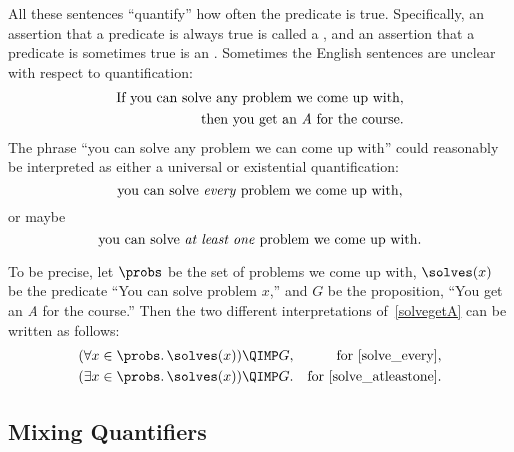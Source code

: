 All these sentences ``quantify'' how often the predicate is true.
Specifically, an assertion that a predicate is always true is called a
, and an assertion that a predicate is
sometimes true is an .  Sometimes the
English sentences are unclear with respect to quantification:
\begin{align}
  \text{If you can solve any problem we come up with,}\notag\\
  \text{then you get an \emph{A} for the course.}\label{solvegetA}
\end{align}
%
The phrase ``you can solve any problem we can come up with'' could
reasonably be interpreted as either a universal or existential
quantification:
\begin{equation}\label{solve_every}
\text{you can solve \emph{every} problem we come up with,}
\end{equation}
or maybe
\begin{equation}\label{solve_atleastone}
\text{you can solve \emph{at least one} problem we come up with.}
\end{equation}

\iffalse
In any case, notice that this quantified phrase appears inside a
larger if-then statement.  This is quite normal; quantified statements
are themselves propositions and can be combined
with \QAND, \QOR, \QIMPLIES, etc., just like any other proposition.
\fi
To be precise, let $\probs$ be the set of problems we come up with,
$\solves(x)$ be the predicate ``You can solve problem $x$,'' and $G$
be the proposition, ``You get an \emph{A} for the course.''  Then the
two different interpretations of~\eqref{solvegetA}
can be written as follows:
\begin{align*}
(\forall x \in \probs.\, & \solves(x)) \QIMP G,
     & \text{for~\eqref{solve_every}},\\
(\exists x \in \probs.\, & \solves(x)) \QIMP G.
     & \text{for~\eqref{solve_atleastone}}.
\end{align*}

\subsection{Mixing Quantifiers}

